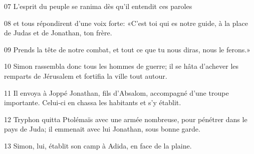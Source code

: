 
07 L’esprit du peuple se ranima dès qu’il entendit ces paroles

08 et tous répondirent d’une voix forte: «C’est toi qui es notre guide, à la place de Judas et de Jonathan, ton frère.

09 Prends la tête de notre combat, et tout ce que tu nous diras, nous le ferons.»

10 Simon rassembla donc tous les hommes de guerre; il se hâta d’achever les remparts de Jérusalem et fortifia la ville tout autour.

11 Il envoya à Joppé Jonathan, fils d’Absalom, accompagné d’une troupe importante. Celui-ci en chassa les habitants et s’y établit.

12 Tryphon quitta Ptolémaïs avec une armée nombreuse, pour pénétrer dans le pays de Juda; il emmenait avec lui Jonathan, sous bonne garde.

13 Simon, lui, établit son camp à Adida, en face de la plaine.

